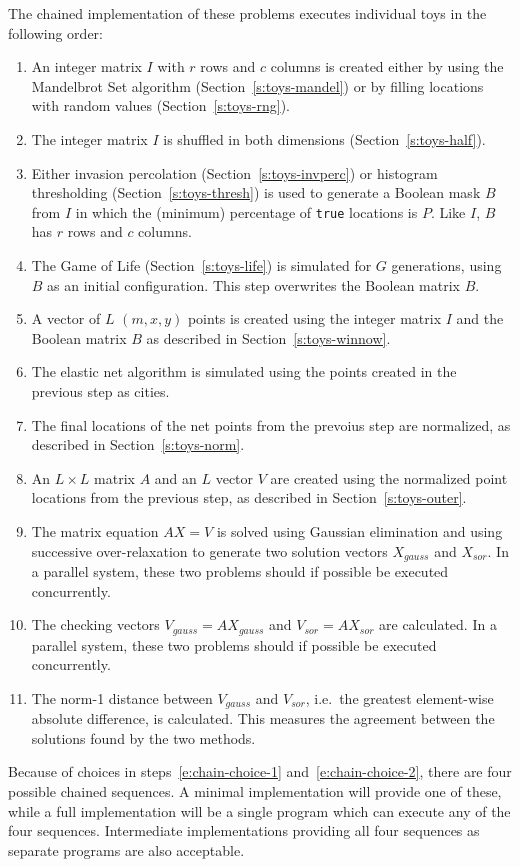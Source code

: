The chained implementation of these problems
executes individual toys in the following order:
\begin{enumerate}
\item	An integer matrix $I$ with $r$ rows and $c$ columns is created
	either by using the Mandelbrot Set algorithm (Section~\ref{s:toys-mandel}) or by filling locations with random values (Section~\ref{s:toys-rng}).
	\label{e:chain-choice-1}
\item	The integer matrix $I$ is shuffled in both dimensions (Section~\ref{s:toys-half}).
\item	Either invasion percolation (Section~\ref{s:toys-invperc}) or histogram thresholding (Section~\ref{s:toys-thresh}) is used
	to generate a Boolean mask $B$ from $I$ in which the (minimum) percentage of {\tt{true}} locations is $P$.
	Like $I$, $B$ has $r$ rows and $c$ columns.
	\label{e:chain-choice-2}
\item	The Game of Life (Section~\ref{s:toys-life}) is simulated for $G$ generations, using $B$ as an initial configuration.
	This step overwrites the Boolean matrix $B$.
\item	A vector of $L$ $(m,x,y)$ points is created using the integer matrix $I$ and the Boolean matrix $B$ as described in Section~\ref{s:toys-winnow}.
\item	The elastic net algorithm is simulated using the points created in the previous step as cities.
\item	The final locations of the net points from the prevoius step are normalized, as described in Section~\ref{s:toys-norm}.
\item	An $L{\times}L$ matrix $A$ and an $L$ vector $V$ are created using the normalized point locations from the previous step,
	as described in Section~\ref{s:toys-outer}.
\item	The matrix equation $AX=V$ is solved using Gaussian elimination and using successive over-relaxation
	to generate two solution vectors $X_{gauss}$ and $X_{sor}$.
	In a parallel system, these two problems should if possible be executed concurrently.
\item	The checking vectors $V_{gauss} = A X_{gauss}$ and $V_{sor} = A X_{sor}$ are calculated.
	In a parallel system, these two problems should if possible be executed concurrently.
\item	The norm-1 distance between $V_{gauss}$ and $V_{sor}$, i.e.\ the greatest element-wise absolute difference, is calculated.
	This measures the agreement between the solutions found by the two methods.
\end{enumerate}
Because of choices in steps~\ref{e:chain-choice-1} and~\ref{e:chain-choice-2},
there are four possible chained sequences.
A minimal implementation will provide one of these,
while a full implementation will be a single program which can execute any of the four sequences.
Intermediate implementations providing all four sequences as separate programs are also acceptable.


